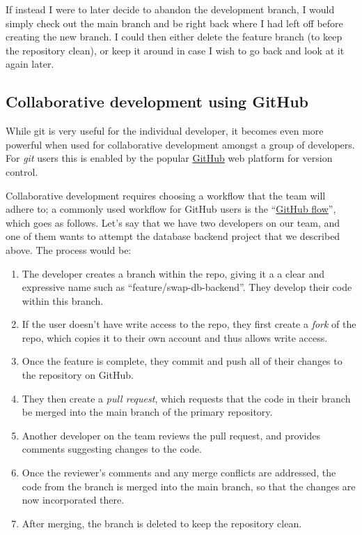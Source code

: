 If instead I were to later decide to abandon the development branch, I would simply check out the main branch and be right back where I had left off before creating the new branch.
I could then either delete the feature branch (to keep the repository clean), or keep it around in case I wish to go back and look at it again later.

\subsection{Collaborative development using GitHub}

While git is very useful for the individual developer, it becomes even more powerful when used for collaborative development amongst a group of developers.
For \textit{git} users this is enabled by the popular \href{http://github.com}{GitHub} web platform for version control.

Collaborative development requires choosing a workflow that the team will adhere to; a commonly used workflow for GitHub users is the ``\href{https://docs.github.com/en/get-started/using-github/github-flow}{GitHub flow}'', which goes as follows.
Let's say that we have two developers on our team, and one of them wants to attempt the database backend project that we described above.
The process would be:

\begin{enumerate}
\item The developer creates a branch within the repo, giving it a a clear and expressive name such as ``feature/swap-db-backend''. They develop their code within this branch.
\item If the user doesn't have write access to the repo, they first create a \textit{fork} of the repo, which copies it to their own account and thus allows write access.
\item Once the feature is complete, they commit and push all of their changes to the repository on GitHub.
\item They then create a \textit{pull request}, which requests that the code in their branch be merged into the main branch of the primary repository.
\item Another developer on the team reviews the pull request, and provides comments suggesting changes to the code.
\item Once the reviewer's comments and any merge conflicts are addressed, the code from the branch is merged into the main branch, so that the changes are now incorporated there.
\item After merging, the branch is deleted to keep the repository clean.
\end{enumerate}

